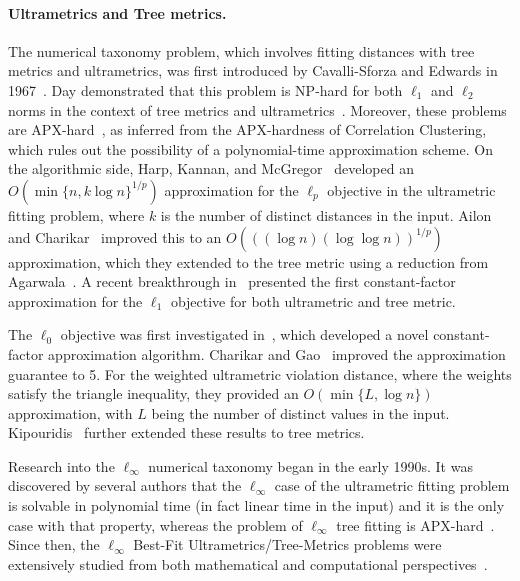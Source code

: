 \documentclass{article}
\begin{document}
\paragraph{Ultrametrics and Tree metrics.} The numerical taxonomy problem, which involves fitting distances with tree metrics and ultrametrics, was first introduced by Cavalli-Sforza and Edwards in 1967~\cite{4-cavalli67}. Day demonstrated that this problem is NP-hard for both $\ell_1$ and $\ell_2$ norms in the context of tree metrics and ultrametrics~\cite{day}. Moreover, these problems are APX-hard~\cite{apxCorrClust}, as inferred from the APX-hardness of Correlation Clustering, which rules out the possibility of a polynomial-time approximation scheme. On the algorithmic side, Harp, Kannan, and McGregor~\cite{mcgregor} developed an $O(\min\{n, k \log{n}\}^{1/p})$ approximation for the $\ell_p$ objective in the ultrametric fitting problem, where $k$ is the number of distinct distances in the input. Ailon and Charikar~\cite{charikar} improved this to an $O(((\log{n})(\log\log{n}))^{1/p})$ approximation, which they extended to the tree metric using a reduction from Agarwala~\cite{agarwala}.
A recent breakthrough in~\cite{debarati} presented the first constant-factor approximation for the $\ell_1$ objective for both ultrametric and tree metric. 

The $\ell_0$ objective was first investigated in~\cite{cohen2022fitting}, which developed a novel constant-factor approximation algorithm.
Charikar and Gao~\cite{CharikarG24} improved the approximation guarantee to 5. For the weighted ultrametric violation distance, where the weights satisfy the triangle inequality, they provided an $O(\min\{L, \log n\})$ approximation, with $L$ being the number of distinct values in the input. Kipouridis~\cite{kipouridis2023fitting} further extended these results to tree metrics.

Research into the $\ell_\infty$ numerical taxonomy began in the early 1990s.
It was discovered by several authors that the $\ell_\infty$ case of the ultrametric fitting problem is solvable in polynomial time (in fact linear time in the input) and it is the only case with that property, whereas the problem of $\ell_\infty$ tree fitting is APX-hard~\cite{kvrivanek1988complexity, chepoi2000approximation, farach1993robust, agarwala, wareham1992computational}. Since then, the 
$\ell_\infty$ Best-Fit Ultrametrics/Tree-Metrics problems were extensively studied from both mathematical and computational perspectives~\cite{chepoi2000approximation, bernstein2017infinity, bernstein2020infinity, ardila2005subdominant, dress2005delta, ma1999fitting,ca20,CAVL21}.
\end{document}
